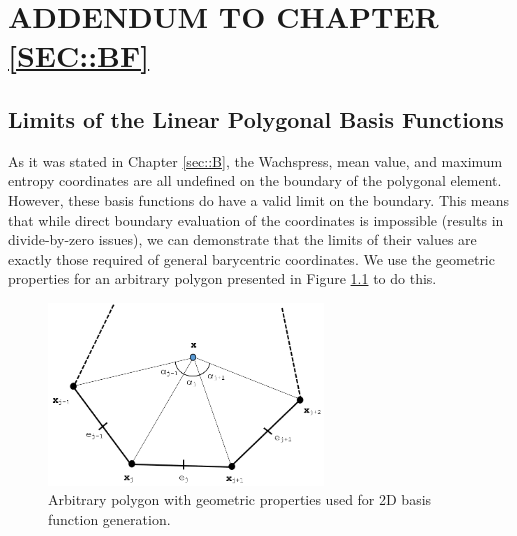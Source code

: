 %
%
%

\chapter{\uppercase{Addendum to Chapter \ref{sec::BF}}}
\label{sec::appendix_BF}

\section{Limits of the Linear Polygonal Basis Functions}
\label{sec::appendix_BF_Limits}

As it was stated in Chapter \ref{sec::B}, the Wachspress, mean value, and maximum entropy coordinates are all undefined on the boundary of the polygonal element. However, these basis functions do have a valid limit on the boundary. This means that while direct boundary evaluation of the coordinates is impossible (results in divide-by-zero issues), we can demonstrate that the limits of their values are exactly those required of general barycentric coordinates. We use the geometric properties for an arbitrary polygon presented in Figure \ref{fig::App_BF_2D_ref_polygon} to do this.

\begin{figure}
\centering
\includegraphics[width=0.65\textwidth]{figures/appendices/ref_polygon.png}
\caption{Arbitrary polygon with geometric properties used for 2D basis function generation.}
\label{fig::App_BF_2D_ref_polygon}
\end{figure}

